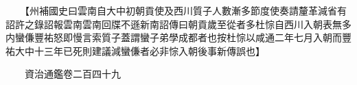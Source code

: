 　　【州補國史曰雲南自大中初朝貢使及西川質子人數漸多節度使奏請釐革減省有詔許之錄詔報雲南雲南回牒不遜新南詔傳曰朝貢歲至從者多杜悰自西川入朝表無多内蠻傔豐祐怒即慢言索質子蓋謂蠻子弟學成都者也按杜悰以咸通二年七月入朝而豐祐大中十三年已死則建議減蠻傔者必非悰入朝後事新傳誤也】

　　資治通鑑卷二百四十九


    


 


 



 

 
  







 


　　
　　
　
　
　


　　

　















	
	









































 
  



















 





 












  
  
  

 






